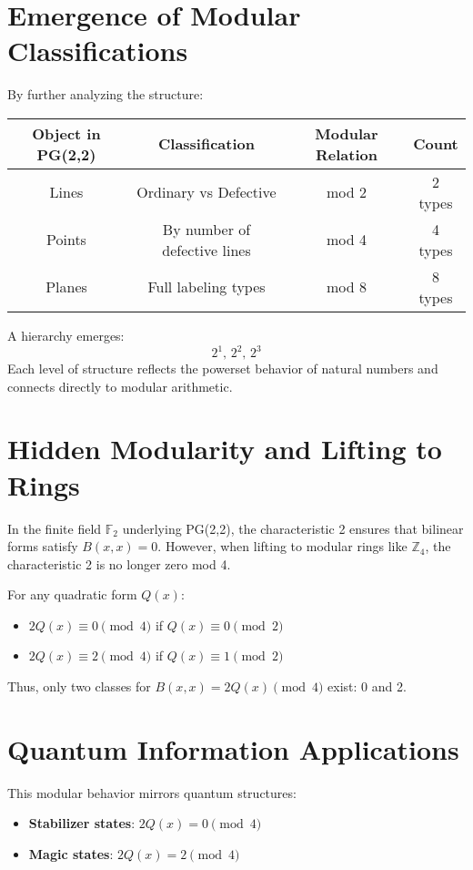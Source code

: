 \documentclass[11pt]{article}
\begin{document}
\section{Emergence of Modular Classifications}

By further analyzing the structure:

\begin{center}
\begin{tabular}{cccc}
\toprule
Object in PG(2,2) & Classification & Modular Relation & Count \\
\midrule
Lines & Ordinary vs Defective & mod 2 & 2 types \\
Points & By number of defective lines & mod 4 & 4 types \\
Planes & Full labeling types & mod 8 & 8 types \\
\bottomrule
\end{tabular}
\end{center}

A hierarchy emerges:
\[
2^1,\, 2^2,\, 2^3
\]
Each level of structure reflects the powerset behavior of natural numbers and connects directly to modular arithmetic.

\section{Hidden Modularity and Lifting to Rings}

In the finite field $\mathbb{F}_2$ underlying PG(2,2), the characteristic 2 ensures that bilinear forms satisfy $B(x,x) = 0$. However, when lifting to modular rings like $\mathbb{Z}_4$, the characteristic 2 is no longer zero mod 4.

For any quadratic form $Q(x)$:
\begin{itemize}
    \item $2Q(x) \equiv 0 \pmod{4}$ if $Q(x) \equiv 0 \pmod{2}$
    \item $2Q(x) \equiv 2 \pmod{4}$ if $Q(x) \equiv 1 \pmod{2}$
\end{itemize}
Thus, only two classes for $B(x,x) = 2Q(x) \pmod{4}$ exist: 0 and 2.

\section{Quantum Information Applications}

This modular behavior mirrors quantum structures:
\begin{itemize}
    \item \textbf{Stabilizer states}: $2Q(x) = 0 \pmod{4}$
    \item \textbf{Magic states}: $2Q(x) = 2 \pmod{4}$
\end{itemize}
\end{document}
